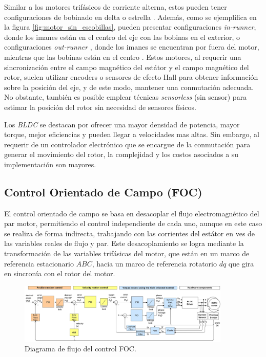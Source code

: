 \documentclass[11pt]{report}
\begin{document}
Similar a los motores trifásicos de corriente alterna, estos pueden tener configuraciones de bobinado en delta o estrella \cite{Millet2022}. Además, como se ejemplifica en la figura \ref{fig:motor_sin_escobillas}, pueden presentar configuraciones \textit{in-runner}, donde los imanes están en el centro del eje con las bobinas en el exterior, o configuraciones \textit{out-runner} , donde los imanes se encuentran por fuera del motor, mientras que las bobinas están en el centro \cite{9774372}. Estos motores, al requerir una sincronización entre el campo magnético del estátor y el campo magnético del rotor, suelen utilizar encoders o sensores de efecto Hall para obtener información sobre la posición del eje, y de este modo, mantener una conmutación adecuada. No obstante, también es posible emplear técnicas \textit{sensorless} (sin sensor) para estimar la posición del rotor sin necesidad de sensores físicos. \cite{Gualtieri2018_STEP}

Los \textit{BLDC} se destacan por ofrecer una mayor densidad de potencia, mayor torque, mejor eficiencias y pueden llegar a velocidades mas altas. Sin embargo, al requerir de un controlador electrónico que se encargue de la conmutación para generar el movimiento del rotor, la complejidad y los costos asociados a su implementación son mayores. \cite{AN885}

\newpage
\subsection{Control Orientado de Campo (FOC)}
El control orientado de campo se basa en desacoplar el flujo electromagnético del par motor, permitiendo el control independiente de cada uno, aunque en este caso se realiza de forma indirecta, trabajando con las corrientes del estátor en ves de las variables reales de flujo y par. Este desacoplamiento se logra mediante la transformación de las variables trifásicas del motor, que están en un marco de referencia estacionario \(ABC\), hacia un marco de referencia rotatorio \(dq\) que gira en sincronía con el rotor del motor. \cite{power_conv_14}

\begin{figure}[ht]
	\centering
	\includegraphics[width=0.9\textwidth]{imagenes/Diagramas/simpleFOC.jpg}
	\caption{Diagrama de flujo del control FOC\cite{Skuric_SimpleFOC_A_Field_2022}.}
	\label{fig:foc_transform}
\end{figure}
\FloatBarrier
\end{document}
